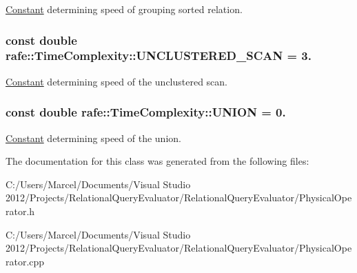 \hyperlink{classrafe_1_1_constant}{Constant} determining speed of grouping sorted relation. \hypertarget{classrafe_1_1_time_complexity_a7fbcf1745878b423e54d5d42efe13154}{
\subsubsection[{U\+N\+C\+L\+U\+S\+T\+E\+R\+E\+D\+\_\+\+S\+C\+A\+N}]{\setlength{\rightskip}{0pt plus 5cm}const double rafe\+::\+Time\+Complexity\+::\+U\+N\+C\+L\+U\+S\+T\+E\+R\+E\+D\+\_\+\+S\+C\+A\+N = 3.\hspace{0.3cm}{\ttfamily [static]}}}\label{classrafe_1_1_time_complexity_a7fbcf1745878b423e54d5d42efe13154}
\hyperlink{classrafe_1_1_constant}{Constant} determining speed of the unclustered scan. \hypertarget{classrafe_1_1_time_complexity_a80c58870ea145943f70db0d09375efda}{
\subsubsection[{U\+N\+I\+O\+N}]{\setlength{\rightskip}{0pt plus 5cm}const double rafe\+::\+Time\+Complexity\+::\+U\+N\+I\+O\+N = 0.\hspace{0.3cm}{\ttfamily [static]}}}\label{classrafe_1_1_time_complexity_a80c58870ea145943f70db0d09375efda}
\hyperlink{classrafe_1_1_constant}{Constant} determining speed of the union. 

The documentation for this class was generated from the following files\+:\begin{DoxyCompactItemize}
\item 
C\+:/\+Users/\+Marcel/\+Documents/\+Visual Studio 2012/\+Projects/\+Relational\+Query\+Evaluator/\+Relational\+Query\+Evaluator/Physical\+Operator.\+h\item 
C\+:/\+Users/\+Marcel/\+Documents/\+Visual Studio 2012/\+Projects/\+Relational\+Query\+Evaluator/\+Relational\+Query\+Evaluator/Physical\+Operator.\+cpp\end{DoxyCompactItemize}
